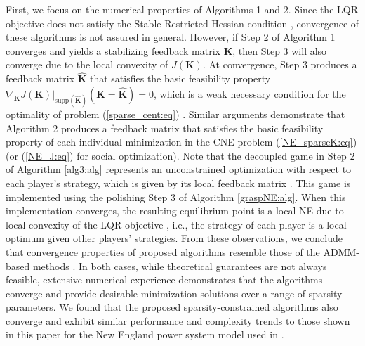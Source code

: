 \documentclass[12pt, draftclsnofoot,onecolumn]{IEEEtran}
\begin{document}
First, we focus on the numerical properties of Algorithms 1 and 2. Since the LQR objective does not satisfy the Stable Restricted Hessian condition \cite{bahmani2013greedy}, convergence of these algorithms is not assured in general. However, if Step 2 of Algorithm 1 converges and yields a stabilizing feedback matrix ${\boldsymbol K}$, then Step 3 will also converge due to the local convexity of $J({\boldsymbol K})$. At convergence, Step 3 produces a feedback matrix $\hat{\boldsymbol K}$ that satisfies the basic feasibility property $\nabla_{\boldsymbol K}J(\boldsymbol K)|_{\mathrm{supp}(\hat{\boldsymbol K})}(\boldsymbol K=\hat{\boldsymbol K}) = 0$, which is a weak necessary condition for the optimality of problem (\ref{sparse_cent:eq}) \cite{beck2013sparsity}. Similar arguments demonstrate that Algorithm 2 produces a feedback matrix that satisfies the basic feasibility property of each individual minimization in the CNE problem (\ref{NE_sparseK:eq}) (or (\ref{NE_J:eq}) for social optimization). Note that the decoupled game in Step 2 of Algorithm {\ref{alg3:alg}} represents an unconstrained optimization with respect to each player's strategy, which is given by its local feedback matrix \cite{lianensuring}. This game is implemented using the polishing Step 3 of Algorithm {\ref{graspNE:alg}}. When this implementation converges, the resulting equilibrium point is a local NE \cite{ratliff2013characterization} due to local convexity of the LQR objective \cite{rautert1997computational}, i.e., the strategy of each player is a local optimum given other players' strategies. From these observations, we conclude that convergence properties of proposed algorithms resemble those of the ADMM-based methods \cite{dorjovchebulTPS14}. In both cases, while theoretical guarantees are not always feasible, extensive numerical experience demonstrates that the algorithms converge and provide desirable minimization solutions over a range of sparsity parameters. We found that the proposed sparsity-constrained algorithms also converge and exhibit similar performance and complexity trends to those shown in this paper for the New England power system model used in \cite{dorjovchebulTPS14}.
\end{document}
